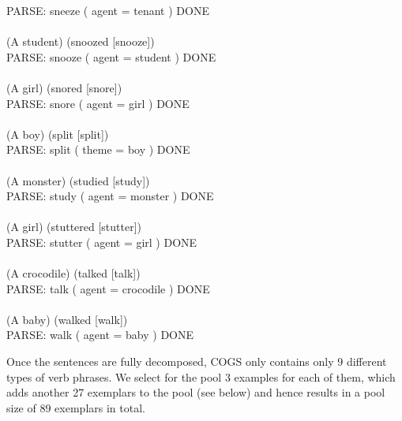 \documentclass{article} \usepackage{iclr2022_conference,times}
\begin{document}
{PARSE: sneeze ( agent = tenant ) DONE \\
 \\
(A student) (snoozed [snooze]) \\
PARSE: snooze ( agent = student ) DONE \\
 \\
(A girl) (snored [snore]) \\
PARSE: snore ( agent = girl ) DONE \\
 \\
(A boy) (split [split]) \\
PARSE: split ( theme = boy ) DONE \\
 \\
(A monster) (studied [study]) \\
PARSE: study ( agent = monster ) DONE \\
 \\
(A girl) (stuttered [stutter]) \\
PARSE: stutter ( agent = girl ) DONE \\
 \\
(A crocodile) (talked [talk]) \\
PARSE: talk ( agent = crocodile ) DONE \\
 \\
(A baby) (walked [walk]) \\
PARSE: walk ( agent = baby ) DONE
}

Once the sentences are fully decomposed, COGS only contains only 9 different types of verb phrases. We select for the pool 3 examples for each of them, which adds another 27 exemplars to the pool (see below) and hence results in a pool size of 89 exemplars in total.
\end{document}
